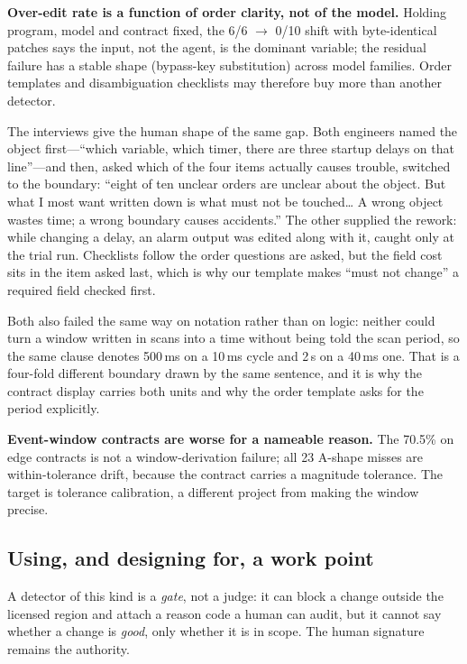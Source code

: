 \documentclass[acmsmall,screen,review,anonymous]{acmart}
\begin{document}
\textbf{Over-edit rate is a function of order clarity, not of the model.} Holding program, model and contract fixed, the 6/6 $\to$ 0/10 shift with byte-identical patches says the input, not the agent, is the dominant variable; the residual failure has a stable shape (bypass-key substitution) across model families. Order templates and disambiguation checklists may therefore buy more than another detector.

The interviews give the human shape of the same gap. Both engineers named the object first---``which variable, which timer, there are three startup delays on that line''---and then, asked which of the four items actually causes trouble, switched to the boundary: ``eight of ten unclear orders are unclear about the object. But what I most want written down is what must not be touched\ldots{} A wrong object wastes time; a wrong boundary causes accidents.'' The other supplied the rework: while changing a delay, an alarm output was edited along with it, caught only at the trial run. Checklists follow the order questions are asked, but the field cost sits in the item asked last, which is why our template makes ``must not change'' a required field checked first.

Both also failed the same way on notation rather than on logic: neither could turn a window written in scans into a time without being told the scan period, so the same clause denotes 500\,ms on a 10\,ms cycle and 2\,s on a 40\,ms one. That is a four-fold different boundary drawn by the same sentence, and it is why the contract display carries both units and why the order template asks for the period explicitly.

\textbf{Event-window contracts are worse for a nameable reason.} The 70.5\% on edge contracts is not a window-derivation failure; all 23 A-shape misses are within-tolerance drift, because the contract carries a magnitude tolerance. The target is tolerance calibration, a different project from making the window precise.

\subsection{Using, and designing for, a work point}

A detector of this kind is a \emph{gate}, not a judge: it can block a change outside the licensed region and attach a reason code a human can audit, but it cannot say whether a change is \emph{good}, only whether it is in scope. The human signature remains the authority.
\end{document}

